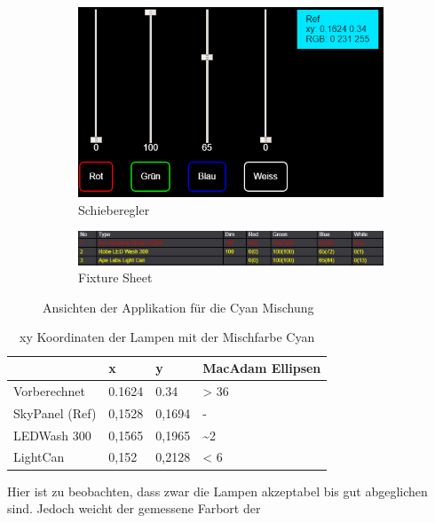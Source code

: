 \documentclass[11pt]{scrartcl}
\begin{document}
\begin{figure}[H]
    \centering
    \begin{subfigure}[b]{.39\textwidth}
        \includegraphics[width=\textwidth]{images/app_mix_cyan_faders.png}
        \caption{Schieberegler}
    \end{subfigure}
    \hfill 
    \begin{subfigure}[b]{.59\textwidth}
        \includegraphics[width=\textwidth]{images/app_mix_cyan_fixtureSheet.png}
        \caption{Fixture Sheet}
    \end{subfigure}
    \caption{Ansichten der Applikation für die Cyan Mischung}
\end{figure}
\noindent
\begin{table}[H]
    \begin{tabularx}{\textwidth}{|X|X|X|X|}
        \hline           & x        & y        & MacAdam Ellipsen\\\hline
        Vorberechnet     & 0.1624   & 0.34     & > 36\\\hline
        SkyPanel (Ref)   & 0,1528   & 0,1694   & -\\\hline
        LEDWash 300      & 0,1565   & 0,1965   & \textasciitilde 2\\\hline
        LightCan         & 0,152    & 0,2128   & < 6\\\hline
    \end{tabularx}
    \caption{xy Koordinaten der Lampen mit der Mischfarbe Cyan}
\end{table}
\noindent
Hier ist zu beobachten, dass zwar die Lampen akzeptabel bis gut abgeglichen sind. Jedoch weicht der gemessene Farbort der
\end{document}
